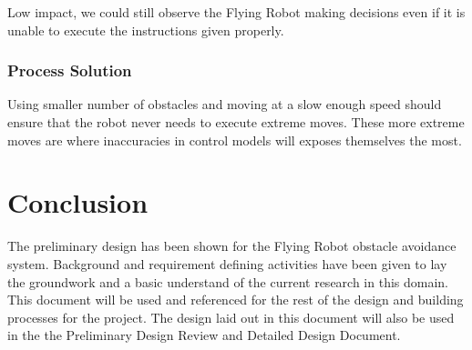 \documentclass{article}
\begin{document}
		Low impact, we could still observe the Flying Robot making decisions even if it is unable to execute the instructions given properly.
		
		\subsubsection{Process Solution}
		
		Using smaller number of obstacles and moving at a slow enough speed should ensure that the robot never needs to execute extreme moves. These more extreme moves are where inaccuracies in control models will exposes themselves the most. 



\section{Conclusion}
The preliminary design has been shown for the Flying Robot obstacle avoidance system. Background and requirement defining activities have been given to lay the groundwork and a basic understand of the current research in this domain. This document will be used and referenced for the rest of the design and building processes for the project. The design laid out in this document will also be used in the the Preliminary Design Review and Detailed Design Document. 



\printbibliography

\end{document}
